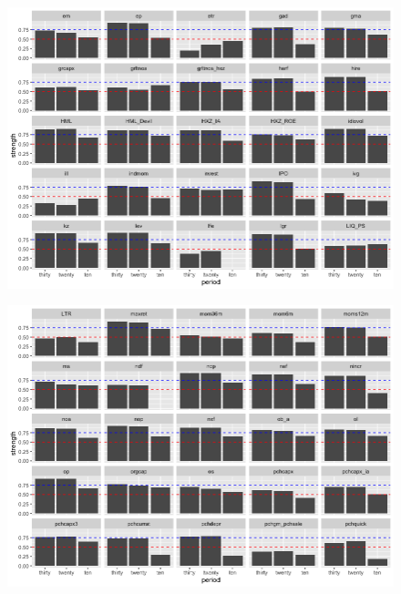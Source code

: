 \documentclass[12pt]{article}
\begin{document}
\begin{landscape}
	\begin{figure}[ht]
		\includegraphics[scale = 0.7]{strength_comparison_III}
		\centering
	\end{figure}
\end{landscape}

\begin{landscape}
	\begin{figure}[ht]
		\includegraphics[scale = 0.7]{strength_comparison_IV}
		\centering
	\end{figure}
\end{landscape}
\end{document}
